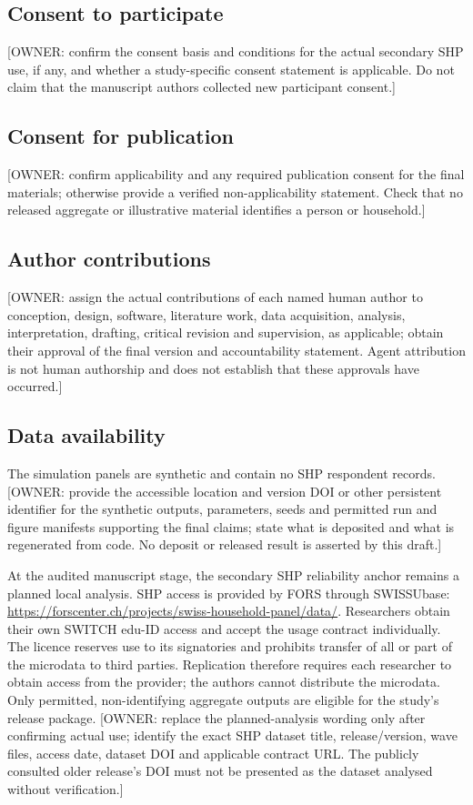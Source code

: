 \subsection*{Consent to participate}
[OWNER: confirm the consent basis and conditions for the actual secondary SHP
use, if any, and whether a study-specific consent statement is applicable.
Do not claim that the manuscript authors collected new participant consent.]

\subsection*{Consent for publication}
[OWNER: confirm applicability and any required publication consent for the final
materials; otherwise provide a verified non-applicability statement. Check that
no released aggregate or illustrative material identifies a person or household.]

\subsection*{Author contributions}
[OWNER: assign the actual contributions of each named human author to conception,
design, software, literature work, data acquisition, analysis, interpretation,
drafting, critical revision and supervision, as applicable; obtain their approval
of the final version and accountability statement. Agent attribution is not human
authorship and does not establish that these approvals have occurred.]

\subsection*{Data availability}
The simulation panels are synthetic and contain no SHP respondent records.
[OWNER: provide the accessible location and version DOI or other persistent
identifier for the synthetic outputs, parameters, seeds and permitted run and
figure manifests supporting the final claims; state what is deposited and what
is regenerated from code. No deposit or released result is asserted by this draft.]

At the audited manuscript stage, the secondary SHP reliability anchor remains a
planned local analysis. SHP access is provided by FORS through SWISSUbase:
\url{https://forscenter.ch/projects/swiss-household-panel/data/}.
Researchers obtain their own SWITCH edu-ID access and accept the usage contract
individually. The licence reserves use to its signatories and prohibits transfer
of all or part of the microdata to third parties. Replication therefore requires
each researcher to obtain access from the provider; the authors cannot distribute
the microdata. Only permitted, non-identifying aggregate outputs are eligible for
the study's release package.
[OWNER: replace the planned-analysis wording only after confirming actual use;
identify the exact SHP dataset title, release/version, wave files, access date,
dataset DOI and applicable contract URL. The publicly consulted older release's
DOI must not be presented as the dataset analysed without verification.]


